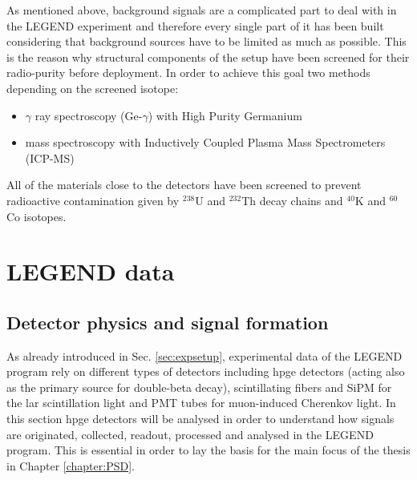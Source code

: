 As mentioned above, background signals are a complicated part to deal with in the LEGEND experiment and therefore every single part of it has been built considering that background sources have to be limited as much as possible. This is the reason why structural components of the setup have been screened for their radio-purity before deployment. In order to achieve this goal two methods depending on the screened isotope:
\begin{itemize}
    \item $\gamma$ ray spectroscopy (Ge-$\gamma$) with High Purity Germanium 
    \item mass spectroscopy with Inductively Coupled Plasma Mass Spectrometers (ICP-MS)
\end{itemize}

All of the materials close to the detectors have been screened to prevent radioactive contamination given by ${}^{238}$U and ${}^{232}$Th decay chains and ${}^{40}$K and ${}^{60}$Co isotopes.

\section{LEGEND data}
\subsection{Detector physics and signal formation}
As already introduced in Sec. \ref{sec:expsetup}, experimental data of the LEGEND program rely on different types of detectors including \ac{hpge} detectors (acting also as the primary source for double-beta decay), scintillating fibers and SiPM for the \ac{lar} scintillation light and PMT tubes for muon-induced Cherenkov light. In this section \ac{hpge} detectors will be analysed in order to understand how signals are originated, collected, readout, processed and analysed in the LEGEND program. This is essential in order to lay the basis for the main focus of the thesis in Chapter \ref{chapter:PSD}.
